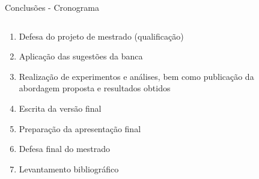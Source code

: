 \documentclass[%
  xcolor=table,%
  10pt,%
  aspectratio = 169,%
  compress,%
  t,%
]{beamer}%
\begin{document}
\begin{frame}{}{Conclusões - Cronograma}
    \begin{columns}
        \begin{column}{0.5\textwidth}
            \begin{enumerate}
                \item Defesa do projeto de mestrado (qualificação)
                \item Aplicação das sugestões da banca
                \item Realização de experimentos e análises, bem como publicação da abordagem proposta e resultados obtidos
                \item Escrita da versão final
                \item Preparação da apresentação final
                \item Defesa final do mestrado
                \item Levantamento bibliográfico
            \end{enumerate}
        \end{column}
        \begin{column}{0.5\textwidth}
            \begin{table}[H]
                \centering
                \caption{Cronograma de atividades até a conclusão do projeto de pesquisa de mestrado}
                \label{tab:cronograma}
\end{table}
\end{column}
\end{columns}
\end{frame}
\end{document}
